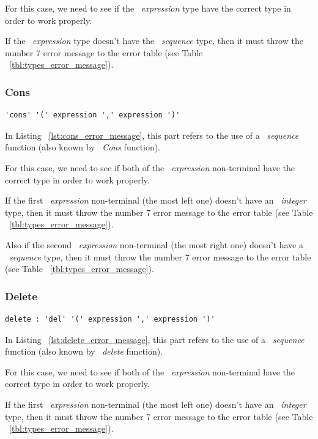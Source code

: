 \documentclass[
  oneside,
  11pt, a4paper,
  footinclude=true,
  headinclude=true,
  cleardoublepage=empty
]{scrbook}
\begin{document}
For this case, we need to see if the ~\textit{expression} type have the correct type in order to work properly.

If the ~\textit{expression} type doesn't have the ~\textit{sequence} type, then it must throw the number 7 error message to the error table (see Table ~\ref{tbl:types_error_message}).

\subsubsection{Cons}

\begin{lstlisting}[caption={Cons rule in LISS},label={lst:cons_error_message}]
  'cons' '(' expression ',' expression ')'
\end{lstlisting}

In Listing ~\ref{lst:cons_error_message}, this part refers to the use of a ~\textit{sequence} function (also known by ~\textit{Cons} function).

For this case, we need to see if both of the ~\textit{expression} non-terminal have the correct type in order to work properly.

If the first ~\textit{expression} non-terminal (the most left one) doesn't have an ~\textit{integer} type, then it must throw the number 7 error message to the error table (see Table ~\ref{tbl:types_error_message}).

Also if the second ~\textit{expression} non-terminal (the most right one) doesn't have a ~\textit{sequence} type, then it must throw the number 7 error message to the error table (see Table ~\ref{tbl:types_error_message}).

\subsubsection{Delete}

\begin{lstlisting}[caption={Delete rule in LISS},label={lst:delete_error_message}]
  delete : 'del' '(' expression ',' expression ')'
\end{lstlisting}

In Listing ~\ref{lst:delete_error_message}, this part refers to the use of a ~\textit{sequence} function (also known by ~\textit{delete} function).

For this case, we need to see if both of the ~\textit{expression} non-terminal have the correct type in order to work properly.

If the first ~\textit{expression} non-terminal (the most left one) doesn't have an ~\textit{integer} type, then it must throw the number 7 error message to the error table (see Table ~\ref{tbl:types_error_message}).
\end{document}
